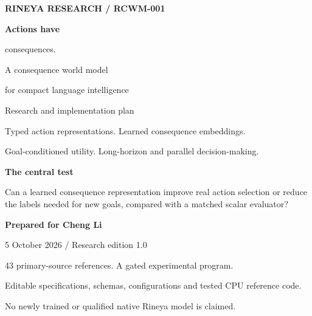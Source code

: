 \documentclass[
  11pt,
  a4paper,
]{article}
\author{}
\date{}
\begin{document}
\begin{titlepage}
\thispagestyle{empty}
\vspace*{0.45cm}
{\sffamily\bfseries\color{Accent}\large RINEYA RESEARCH / RCWM-001\par}
\vspace{1.25cm}
{\sffamily\bfseries\color{Ink}\fontsize{37}{43}\selectfont Actions have\par consequences.\par}
\vspace{0.6cm}
{\sffamily\color{Ink}\fontsize{21}{28}\selectfont A consequence world model\par for compact language intelligence\par}
\vspace{0.9cm}
{\large Research and implementation plan\par}
\vspace{0.25cm}
{\color{Muted}Typed action representations. Learned consequence embeddings.\par Goal-conditioned utility. Long-horizon and parallel decision-making.\par}
\vspace{0.9cm}
\noindent\colorbox{Pale}{\parbox{0.92\textwidth}{\vspace{0.25cm}\hspace{0.15cm}\begin{minipage}{0.86\textwidth}\sffamily\color{Ink}\textbf{The central test}\par
Can a learned consequence representation improve real action selection or reduce the labels needed for new goals, compared with a matched scalar evaluator?
\end{minipage}\vspace{0.25cm}}}
\vfill
{\sffamily\bfseries\color{Ink}Prepared for Cheng Li\par}
\vspace{0.2cm}
{\sffamily\color{Muted}5 October 2026 / Research edition 1.0\par}
\vspace{0.5cm}
{\small\color{Muted}43 primary-source references. A gated experimental program.\par Editable specifications, schemas, configurations and tested CPU reference code.\par No newly trained or qualified native Rineya model is claimed.\par}
\end{titlepage}
\setcounter{page}{1}
\end{document}
